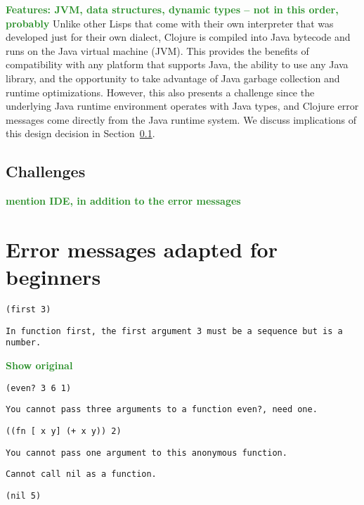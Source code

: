 \documentclass[submission,copyright,creativecommons]{eptcs}
\newcommand{\allcomments}[1]{{#1}}
\newcommand{\emcomment}[1]{{\bf \textcolor{ForestGreen}{\allcomments{{#1}}}}}
\begin{document}
\emcomment{Features: JVM, data structures, dynamic types -- not in this order, probably}
Unlike other Lisps that come with their own interpreter that was developed just for their own dialect, Clojure is compiled 
into Java bytecode and runs on the Java virtual machine (JVM). This provides the benefits of compatibility with 
any platform that supports Java, the ability to use any Java library, and the opportunity to take advantage of Java 
garbage collection and runtime optimizations. However, this also presents a challenge since the underlying Java 
runtime environment operates with Java types, and Clojure error messages come directly from the Java runtime
system. We discuss implications of this design decision in Section~\ref{subsec:challenges}.

\subsection{Challenges}\label{subsec:challenges}

\emcomment{mention IDE, in addition to the error messages}

\section{Error messages adapted for beginners}\label{sec:errors-work}

{\tt (first 3)}

\begin{verbatim}
In function first, the first argument 3 must be a sequence but is a number.
\end{verbatim}

\emcomment{Show original}

{\tt (even? 3 6 1)}

\begin{verbatim}
You cannot pass three arguments to a function even?, need one.
\end{verbatim}

{\tt ((fn [ x y] (+ x y)) 2)}

\begin{verbatim}
You cannot pass one argument to this anonymous function.
\end{verbatim}

\begin{verbatim}
Cannot call nil as a function.
\end{verbatim}

{\tt (nil 5)}
\end{document}
